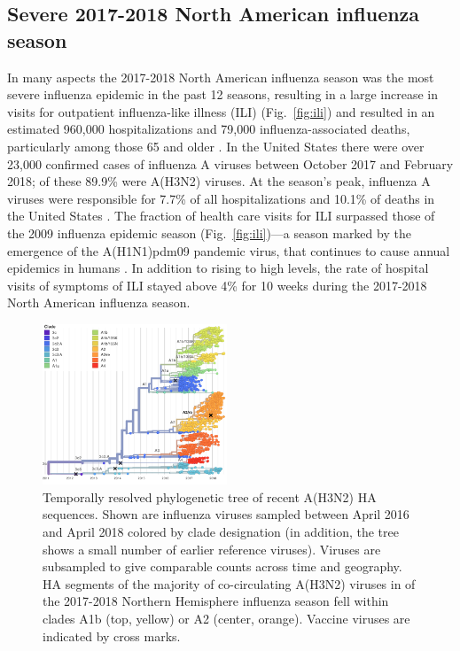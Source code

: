 \subsection*{Severe 2017-2018 North American influenza season}
In many aspects the 2017-2018 North American influenza season was the most severe influenza epidemic in the past 12 seasons, resulting in a large increase in visits for outpatient influenza-like illness (ILI) (Fig.~\ref{fig:ili}) and resulted in an estimated 960,000 hospitalizations and 79,000 influenza-associated deaths, particularly among those 65 and older \citep{Estimate3:online}.
In the United States there were over 23,000 confirmed cases of influenza A viruses between October 2017 and February 2018; of these 89.9\% were A(H3N2) viruses.
At the season’s peak, influenza A viruses were responsible for 7.7\% of all hospitalizations and 10.1\% of deaths in the United States \citep{MMWR2018}.
The fraction of health care visits for ILI surpassed those of the 2009 influenza epidemic season (Fig.~\ref{fig:ili})---a season marked by the emergence of the A(H1N1)pdm09 pandemic virus, that continues to cause annual epidemics in humans \citep{garten_antigenic_2009}.
In addition to rising to high levels, the rate of hospital visits of symptoms of ILI stayed above 4\% for 10 weeks during the 2017-2018 North American influenza season.

\begin{figure}[t]
    \begin{center}
    \includegraphics[width=0.49\textwidth]{figures/2y_clades.png}
    \end{center}
    \caption{Temporally resolved phylogenetic tree of recent A(H3N2) HA sequences. Shown are influenza viruses sampled between April 2016 and April 2018 colored by clade designation (in addition, the tree shows a small number of earlier reference viruses). Viruses are subsampled to give comparable counts across time and geography. HA segments of the majority of co-circulating A(H3N2) viruses in of the 2017-2018 Northern Hemisphere influenza season fell within clades A1b (top, yellow) or A2 (center, orange). Vaccine viruses are indicated by cross marks. }
    \label{fig:2y_clades}
\end{figure}

